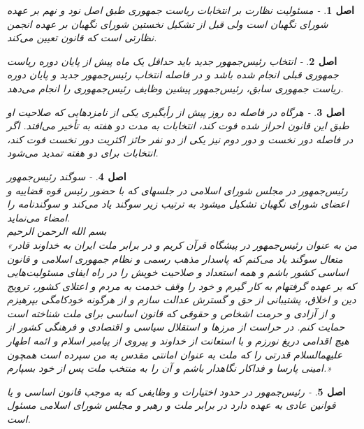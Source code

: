 \documentclass[12pt]{article}
\newtheorem{asl}{اصل}
\begin{document}
\begin{asl}-  
مسئولیت نظارت بر انتخابات ریاست جمهوری طبق اصل نود و نهم بر عهده شورای نگهبان است ولی قبل از تشکیل نخستین شورای نگهبان بر عهده انجمن نظارتی است که قانون تعیین می‌کند. 
\end{asl}

\begin{asl}- 
انتخاب رئیس‌جمهور جدید باید حداقل یک ماه پیش از پایان دوره ریاست جمهوری قبلی انجام شده باشد و در فاصله انتخاب رئیس‌جمهور جدید و پایان دوره ریاست جمهوری سابق، رئیس‌جمهور پیشین وظایف رئیس‌جمهوری را انجام می‌دهد. 
\end{asl}

\begin{asl}- 
هرگاه در فاصله ده روز پیش از رأی‏گیری یکی از نامزدهایی که صلاحیت او طبق این قانون احراز شده فوت کند، انتخابات به مدت دو هفته به تأخیر می‌افتد. اگر در فاصله دور نخست و دور دوم نیز یکی از دو نفر حائز اکثریت دور نخست فوت کند، انتخابات برای دو هفته تمدید می‌شود.  
\end{asl}

\begin{asl}- 
سوگند رئیس‌جمهور
\\
رئیس‌جمهور در مجلس شورای اسلامی در جلسه‏ای که با حضور رئیس قوه قضاییه و اعضای شورای نگهبان تشکیل می‏شود به ترتیب زیر سوگند یاد می‌کند و سوگندنامه را امضاء می‌نماید.
\\
بسم الله الرحمن الرحیم 
\\
«من به عنوان رئیس‌جمهور در پیشگاه قرآن کریم و در برابر ملت ایران به خداوند قادر متعال سوگند یاد می‌کنم که پاسدار مذهب رسمی و نظام جمهوری اسلامی و قانون اساسی کشور باشم و همه استعداد و صلاحیت خویش را در راه ایفای مسئولیت‌هایی که بر عهده‏ گرفته‏ام به کار گیرم و خود را وقف خدمت به مردم و اعتلای کشور، ترویج دین و اخلاق، پشتیبانی از حق و گسترش عدالت سازم و از هرگونه خودکامگی بپرهیزم و از آزادی و حرمت اشخاص و حقوقی که قانون اساسی برای ملت شناخته است حمایت کنم. در حراست از مرزها و استقلال سیاسی و اقتصادی و فرهنگی کشور از هیچ اقدامی دریغ نورزم و با استعانت از خداوند و پیروی از پیامبر اسلام و ائمه اطهار علیهم‏السلام قدرتی را که ملت به عنوان امانتی مقدس به من سپرده است همچون امینی پارسا و فداکار نگاهدار باشم و آن را به منتخب ملت پس از خود بسپارم.»

\end{asl}

\begin{asl}- 
رئیس‌جمهور در حدود اختیارات و وظایفی که به موجب قانون اساسی و یا قوانین عادی به عهده‏ دارد در برابر ملت و رهبر و مجلس شورای اسلامی مسئول است. 
\end{asl}
\end{document}
